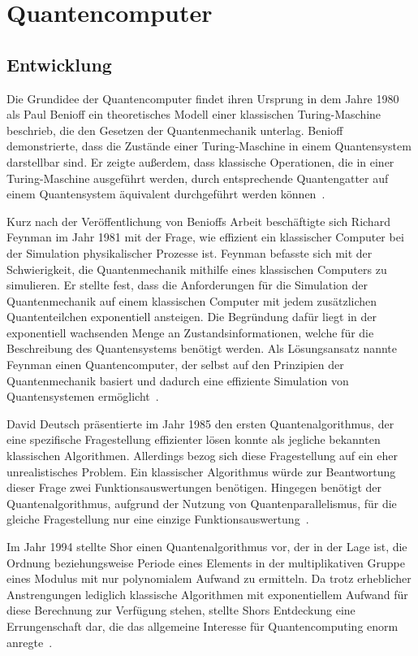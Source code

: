 \section{Quantencomputer}
\subsection{Entwicklung} 
Die Grundidee der Quantencomputer findet ihren Ursprung in dem Jahre 1980 als Paul Benioff ein theoretisches Modell einer klassischen Turing-Maschine beschrieb, 
die den Gesetzen der Quantenmechanik unterlag.
Benioff demonstrierte, dass die Zustände einer Turing-Maschine in einem Quantensystem darstellbar sind. 
Er zeigte außerdem, dass klassische Operationen, die in einer Turing-Maschine ausgeführt werden, 
durch entsprechende Quantengatter auf einem Quantensystem äquivalent durchgeführt werden können~\cite{benioff1980}.

Kurz nach der Veröffentlichung von Benioffs Arbeit beschäftigte sich Richard Feynman im Jahr 1981 mit der Frage,
wie effizient ein klassischer Computer bei der Simulation physikalischer Prozesse ist.
Feynman befasste sich mit der Schwierigkeit, die Quantenmechanik mithilfe eines klassischen Computers zu simulieren.
Er stellte fest, dass die Anforderungen für die Simulation der Quantenmechanik auf einem klassischen Computer mit jedem zusätzlichen Quantenteilchen exponentiell ansteigen.
Die Begründung dafür liegt in der exponentiell wachsenden Menge an Zustandsinformationen,
welche für die Beschreibung des Quantensystems benötigt werden.
Als Lösungsansatz nannte Feynman einen Quantencomputer, 
der selbst auf den Prinzipien der Quantenmechanik basiert und dadurch eine effiziente Simulation von Quantensystemen ermöglicht~\cite{Feynman1982}.

David Deutsch präsentierte im Jahr 1985 den ersten Quantenalgorithmus, 
der eine spezifische Fragestellung effizienter lösen konnte als jegliche bekannten klassischen Algorithmen. 
Allerdings bezog sich diese Fragestellung auf ein eher unrealistisches Problem. 
Ein klassischer Algorithmus würde zur Beantwortung dieser Frage zwei Funktionsauswertungen benötigen. 
Hingegen benötigt der Quantenalgorithmus, 
aufgrund der Nutzung von Quantenparallelismus, 
für die gleiche Fragestellung nur eine einzige Funktionsauswertung~\cite{deutsch1985}.

Im Jahr 1994 stellte Shor einen Quantenalgorithmus vor, der in der Lage ist, 
die Ordnung beziehungsweise Periode eines Elements in der multiplikativen Gruppe eines Modulus mit nur polynomialem Aufwand zu ermitteln. 
Da trotz erheblicher Anstrengungen lediglich klassische Algorithmen mit exponentiellem Aufwand für diese Berechnung zur Verfügung stehen, 
stellte Shors Entdeckung eine Errungenschaft dar, die das allgemeine Interesse für Quantencomputing enorm anregte~\cite{Shor_1997}.

